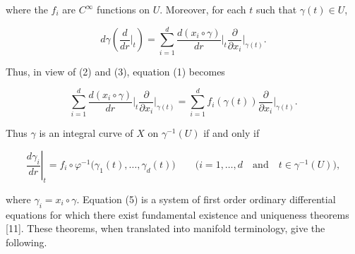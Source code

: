 where the $f_{i}$ are $C^{\infty}$ functions on $U$. Moreover, for each $t$ such that $\gamma(t) \in U$,

\begin{equation}
	\tag{3}\label{eq:1.47:3}
	d\gamma\left(\frac{d}{d r}\bigg\vert_{t}\right)=\sum_{i=1}^{d}\frac{d(x_{i}\circ\gamma)}{d r}\bigg\vert_{t}\frac{\partial}{\partial x_{i}}\bigg\vert_{\gamma(t)}.
\end{equation}

Thus, in view of (2) and (3), equation (1) becomes

\begin{equation}
	\tag{4}\label{eq:1.47:4}
	\sum_{i=1}^{d}\frac{d(x_{i}\circ\gamma)}{d r}\bigg|_{t}\frac{\partial}{\partial x_{i}}\bigg|_{\gamma(t)}=\sum_{i=1}^{d}f_{i}(\gamma(t))\frac{\partial}{\partial x_{i}}\bigg|_{\gamma(t)}.
\end{equation}

Thus $\gamma$ is an integral curve of $X$ on $\gamma^{-1}(U)$ if and only if

\[
	\left.\frac{d\gamma_{i}}{d r}\right|_{t}=f_{i}\circ\varphi^{-1}\big(\gamma_{1}(t),\ldots,\gamma_{d}(t)\big)\qquad\big(i=1,\ldots,d\quad\mathrm{and}\quad t\in\gamma^{-1}(U)\big),
\]

where $\gamma_{i}=x_{i}\circ\gamma$. Equation (5) is a system of first order ordinary differential equations for which there exist fundamental existence and uniqueness theorems [11]. These theorems, when translated into manifold terminology, give the following.

